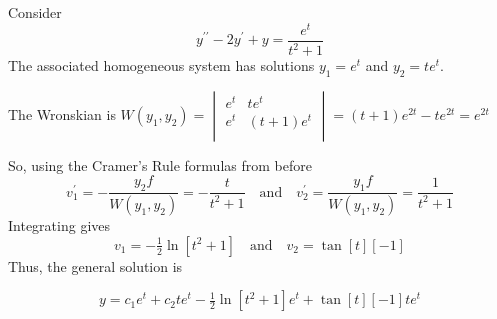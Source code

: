 \documentclass{beamer}
\begin{document}
\begin{frame}
\begin{example}
Consider
\begin{equation*}
y^{\prime\prime}-2y^\prime+y=\dfrac{e^t}{t^2+1}
\end{equation*}\pause
The associated homogeneous system has solutions $y_1=e^t$ and $y_2=te^t$.\pause

\vspace{2mm}
The Wronskian is $W(y_1,y_2)=
\begin{vmatrix}
e^t & te^t     \\
e^t & (t+1)e^t \\
\end{vmatrix}
=(t+1)e^{2t}-te^{2t}=e^{2t}$\pause

\vspace{2mm}
So, using the Cramer's Rule formulas from before
\begin{equation*}
v_1^\prime=-\dfrac{y_2 f}{W(y_1,y_2)}=-\dfrac{t}{t^2+1}
\quad\text{and}\quad
v_2^\prime=\dfrac{y_1 f}{W(y_1,y_2)}=\dfrac{1}{t^2+1}
\end{equation*}\pause
Integrating gives
\begin{equation*}
v_1=-\tfrac{1}{2}\ln[t^2+1]
\quad\text{and}\quad
v_2=\tan[t][-1]
\end{equation*}\pause
Thus, the general solution is

\vspace{-3mm}
\begin{equation*}
y=c_1e^t+c_2te^t-\tfrac{1}{2}\ln[t^2+1]e^t+\tan[t][-1]te^t
\end{equation*}
\end{example}
\end{frame}
\end{document}
